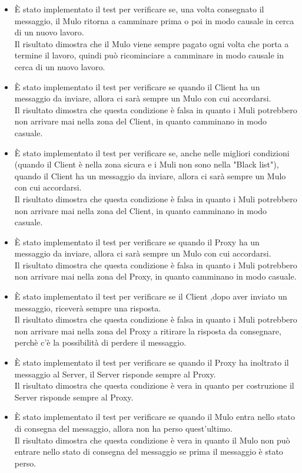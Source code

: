 \documentclass[13pt,a4paper]{article}
\begin{document}
\begin{itemize}
	\item È stato implementato il test per verificare se, una volta  consegnato il messaggio, il Mulo ritorna a camminare prima o poi in modo causale in cerca di un nuovo lavoro.\\
	Il risultato dimostra che il Mulo viene sempre pagato ogni volta che porta a termine il lavoro, quindi può ricominciare a camminare in modo causale in cerca di un nuovo lavoro.
	\item È stato implementato il test per verificare se quando il Client ha un messaggio da inviare, allora ci sarà sempre un Mulo con cui accordarsi.\\
	Il risultato dimostra che questa condizione è falsa in quanto i Muli potrebbero non arrivare mai nella zona del Client, in quanto camminano in modo casuale.
	\item È stato implementato il test per verificare se, anche nelle migliori condizioni (quando il Client è nella zona sicura e i Muli non sono nella "Black list"), quando il Client ha un messaggio da inviare, allora ci sarà sempre un Mulo con cui accordarsi.\\
	Il risultato dimostra che questa condizione è falsa in quanto i Muli potrebbero non arrivare mai nella zona del Client, in quanto  camminano in modo casuale.
	\item È stato implementato il test per verificare se quando il Proxy ha un messaggio da inviare, allora ci sarà sempre un Mulo con cui accordarsi.\\
	Il risultato dimostra che questa condizione è falsa in quanto i Muli potrebbero non arrivare mai nella zona del Proxy, in quanto camminano in modo casuale.
	\item È stato implementato il test per verificare se il Client ,dopo aver inviato un messaggio, riceverà sempre una risposta.\\
	Il risultato dimostra che questa condizione è falsa in quanto i Muli potrebbero non arrivare mai nella zona del Proxy a ritirare la risposta da consegnare, perchè c'è la possibilità di perdere il messaggio.
	\item È stato implementato il test per verificare se quando il Proxy ha inoltrato il messaggio al Server, il Server risponde sempre al Proxy.\\
	Il risultato dimostra che questa condizione è vera in quanto per costruzione il Server risponde sempre al Proxy.
	\item È stato implementato il test per verificare se quando il Mulo entra nello stato di consegna del messaggio, allora non ha perso quest'ultimo.\\
	Il risultato dimostra che questa condizione è vera in quanto il Mulo non può entrare nello stato di consegna del messaggio se prima il messaggio è stato perso. 
\end{itemize}
	
	
\end{document}
